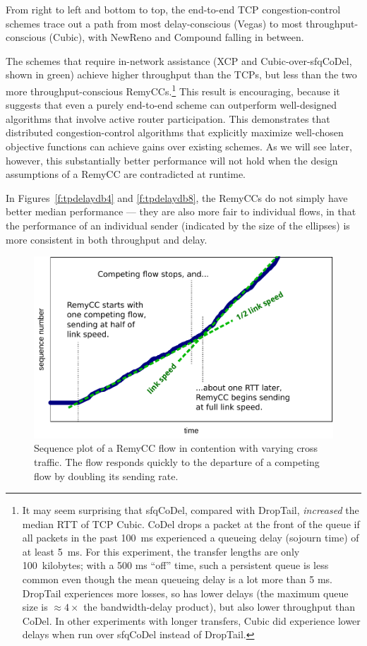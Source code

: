 From right to left and bottom to top, the end-to-end TCP
congestion-control schemes trace out a path from most delay-conscious
(Vegas) to most throughput-conscious (Cubic), with NewReno and Compound
falling in between.

The schemes that require in-network assistance (XCP and
Cubic-over-sfqCoDel, shown in green) achieve higher throughput than
the TCPs, but less than the two more throughput-conscious
RemyCCs.\footnote{It may seem surprising that sfqCoDel, compared with
  DropTail, \emph{increased} the median RTT of TCP Cubic. CoDel drops
  a packet at the front of the queue if all packets in the past 100~ms
  experienced a queueing delay (sojourn time) of at least 5~ms. For
  this experiment, the transfer lengths are only 100~kilobytes; with a
  500 ms ``off'' time, such a persistent queue is less common even
  though the mean queueing delay is a lot more than 5 ms. DropTail
  experiences more losses, so has lower delays (the maximum queue size
  is $\approx 4\times$ the bandwidth-delay product), but also lower
  throughput than CoDel. In other experiments with longer transfers,
  Cubic did experience lower delays when run over sfqCoDel instead of
  DropTail.} This result is encouraging, because it suggests that even
a purely end-to-end scheme can outperform well-designed algorithms
that involve active router participation.  This demonstrates that
distributed congestion-control algorithms that explicitly maximize
well-chosen objective functions can achieve gains over existing
schemes.  As we will see later, however, this substantially better
performance will not hold when the design assumptions of a RemyCC are
contradicted at runtime.

In Figures~\ref{f:tpdelaydb4} and \ref{f:tpdelaydb8}, the RemyCCs do
not simply have better median performance --- they are also more fair
to individual flows, in that the performance of an individual sender
(indicated by the size of the ellipses) is more consistent in both
throughput and delay.

\begin{figure}
\includegraphics[width=\columnwidth]{trace.pdf}
\caption{Sequence plot of a RemyCC flow in contention with varying
  cross traffic. The flow responds quickly to the departure of a
  competing flow by doubling its sending rate.}
\label{f:trace}
\end{figure}

